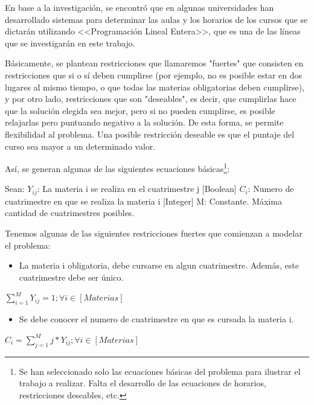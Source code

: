 \documentclass[a4paper]{article}
\begin{document}
En base a la investigación, se encontró que en algunas universidades han desarrollado sistemas para determinar las aulas y los horarios de los cursos que se dictarán utilizando <<Programación Lineal Entera>>, que es una de las líneas que se investigarán en este trabajo.

Básicamente, se plantean restricciones que llamaremos "fuertes"  que consisten en restricciones que si o sí deben cumplirse (por ejemplo, no es posible estar en dos lugares al mismo tiempo, o que todas las materias obligatorias deben cumplirse), y por otro lado, restricciones que son "deseables", es decir, que cumplirlas hace que la solución elegida sea mejor, pero si no pueden cumplirse, es posible relajarlas pero puntuando negativo a la solución. De esta forma, se permite flexibilidad al problema. Una posible restricción deseable es que el puntaje del curso sea mayor a un determinado valor.

Así, se generan algunas de las siguientes ecuaciones básicas\footnote{Se han seleccionado solo las ecuaciones básicas del problema para ilustrar el trabajo a realizar. Falta el desarrollo de las ecuaciones de horarios, restricciones deseables, etc.}:\newline

Sean:\newline
$Y_{ij}$: La materia i se realiza en el cuatrimestre j [Boolean]\newline
$C_{i}$: Numero de cuatrimestre en que se realiza la materia i [Integer]\newline
M: Constante. Máxima cantidad de cuatrimestres posibles. \newline

Tenemos algunas de las siguientes restricciones fuertes que comienzan a modelar el problema:

\begin{itemize}
	\item La materia i obligatoria, debe cursarse en algun cuatrimestre. Además, este cuatrimestre debe ser único.
\end{itemize}

$\sum_{i=1}^{M} Y_{ij} = 1;  \forall i \in [Materias]$

\begin{itemize}
	\item Se debe conocer el numero de cuatrimestre en que es cursada la materia i.
\end{itemize}

$C_{i} = \sum_{j=1}^{M} j * Y_{ij};  \forall i \in [Materias]$
\end{document}
